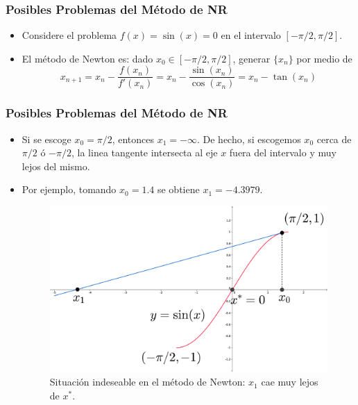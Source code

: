 \documentclass{beamer}
\begin{document}
\begin{frame}
  \frametitle{Posibles Problemas del M\'etodo de NR}
  \begin{itemize}
    \item<1-> Considere el problema $f(x) = \sin(x) = 0$ en el intervalo $[-\pi/2, \pi/2]$. 
    \item<2->El m\'etodo de Newton es: dado $x_0 \in [-\pi/2, \pi/2]$, generar $\{x_n\}$ por medio de
  $$
  x_{n+1} = x_n - \frac{f(x_n)}{f'(x_n)} = x_n - \frac{\sin(x_n)}{\cos(x_n)} = x_n - \tan(x_n)
  $$
    \end{itemize}
  \end{frame}
  \begin{frame}
    \frametitle{Posibles Problemas del M\'etodo de NR}
    \begin{itemize}  
  \item Si se escoge $x_0 = \pi/2$, entonces $x_1 = -\infty$. De hecho, si escogemos $x_0$ cerca de $\pi/2$ \'o $-\pi/2$,
  la linea tangente intersecta al eje $x$ fuera del intervalo y muy lejos del mismo.
  \item<2-> Por ejemplo, tomando $x_0 = 1.4$ se
  obtiene $x_1 = -4.3979$.  
  \begin{figure}[ht]
  \begin{center}
    \includegraphics[scale=0.08]{./curva_newton_p1.eps}
  \end{center}
  \caption{Situaci\'on indeseable en el m\'etodo de Newton: $x_1$ cae muy lejos de $x^*$.}
  \end{figure} 
  \end{itemize} 
\end{frame}
\end{document}

